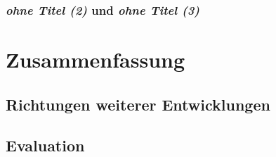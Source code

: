 \documentclass[12pt,a4paper,ngerman]{article}
\begin{document}
\subsubsection{\emph{ohne Titel (2)} und \emph{ohne Titel (3)}}

\section{Zusammenfassung}

\subsection{Richtungen weiterer Entwicklungen}

\subsection{Evaluation}

\newpage

\appendix

\printbibliography

\newpage

\listoffigures

\newpage
\end{document}

